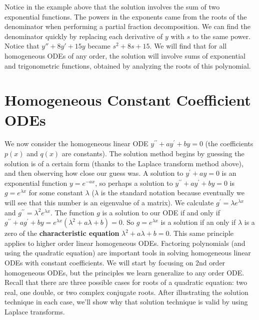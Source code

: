 Notice in the example above that the solution involves the sum of two exponential functions. 
The powers in the exponents came from the roots of the denominator when performing a partial fraction decomposition.  We can find the denominator quickly by replacing each derivative of $y$ with $s$ to the same power.  Notice that $y''+8y'+15y$ became
$s^{2}+8s+15$. We will find that for all homogeneous ODEs of any order, the solution will involve sums of exponential and trigonometric functions, obtained by analyzing the roots of this polynomial. 


\section{Homogeneous Constant Coefficient ODEs}
We now consider the homogeneous linear ODE $y^{\prime\prime}+ay^\prime+by=0$ (the coefficients $p(x)$ and $q(x)$ are constants). The solution method begins by guessing the solution is of a certain form (thanks to the Laplace transform method above), and then observing how close our guess was. A solution to $y^\prime + ay=0$ is an exponential function $y=e^{-ax}$, so perhaps a solution to  $y^{\prime\prime}+ay^\prime+by=0$ is $g=e^{\lambda x}$ for some constant $\lambda$ ($\lambda$ is the standard notation because eventually we will see that this number is an eigenvalue of a matrix).  We calculate $g^\prime = \lambda e^{\lambda x}$ and $g^{\prime\prime} = \lambda^2 e^{\lambda x}$.  The function $g$ is a solution to our ODE if and only if $g^{\prime\prime}+ag^\prime+by=e^{\lambda x}(\lambda^2+a\lambda+b)=0$. So $g=e^{\lambda x}$ is a solution if an only if $\lambda$ is a zero of the \textbf{characteristic equation} $\lambda^2+a\lambda+b=0$. This same principle applies to higher order linear homogeneous ODEs. Factoring polynomials (and using the quadratic equation) are important tools in solving homogeneous linear ODEs with constant coefficients. We will start by focusing on 2nd order homogeneous ODEs, but the principles we learn generalize to any order ODE. Recall that there are three possible cases for roots of a quadratic equation: two real, one double, or two complex conjugate roots. After illustrating the solution technique in each case, we'll show why that solution technique is valid by using Laplace transforms.



